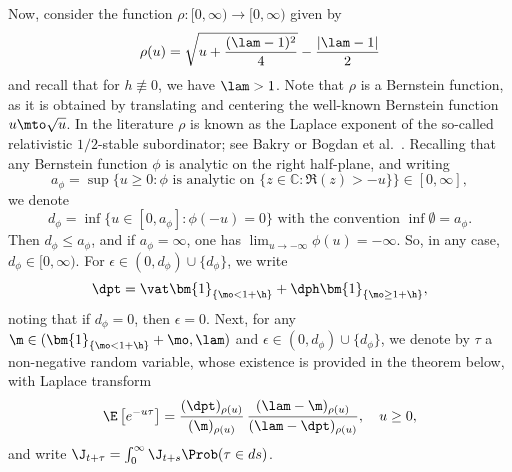 Now, consider the function $\rho:[0,\infty) \to [0,\infty)$ given by
\begin{equation*}
\rho(u) = \sqrt{u+\frac{(\lam-1)^2}{4}}-\frac{\left|\lam-1\right|}{2}
\end{equation*}
and recall that for $h \not\equiv 0$, we have $\lam > 1$. Note that $\rho$ is a Bernstein function, as it is obtained by translating and centering the well-known Bernstein function $u \mto \sqrt{u}$. In the literature $\rho$ is known as the Laplace exponent of the so-called relativistic $1/2$-stable subordinator; see Bakry \cite{Bakry-relativistic} or Bogdan et al.~\cite{Potential2009}. Recalling that any Bernstein function $\phi$ is analytic on the right half-plane, and writing
\[
a_\phi=\sup\bigl\{u \ge 0 : \phi \textrm{ is analytic on } \{z \in \mathbb C : \Re(z)>-u\}\bigr\} \in [0,\infty],
\]
we denote
\begin{equation}
\label{eq:dphi}
d_{\phi} = \inf\{u \in [0,a_\phi] : \phi(-u)=0 \} \mbox{ with the convention }\inf \emptyset = a_{\phi}.
\end{equation}
Then $d_{\phi} \le a_{\phi}$, and if $a_{\phi} = \infty$, one has $\lim_{u \to - \infty} \phi(u) = - \infty$.
So, in any case, $d_{\phi} \in [0, \infty)$. For $\epsilon \in (0,d_\phi) \cup \{d_\phi\}$, we write
\begin{equation}
\label{eq:def-dtheta}
\dpt = \vat \bm{1}_{\{ \mo < 1+\h \}}+ \dph\bm{1}_{\{ \mo \geq 1+\h \}},
\end{equation}
noting that if $d_\phi=0$, then $\epsilon = 0$. Next, for any $\m \in (\bm{1}_{\{\mo < 1+\h\}} + \mo , \lam)$ and $\epsilon \in (0,d_\phi) \cup \{d_\phi\}$, we denote by $\tau$ a non-negative random variable, whose existence is provided in the theorem below, with Laplace transform
\begin{equation}
\label{eq:def-T-Laplace}
\E\left[e^{-u \tau}\right] = \frac{(\dpt)_{\rho(u)}}{(\m)_{\rho(u)}}\, \frac{(\lam-\m)_{\rho(u)}}{(\lam-\dpt)_{\rho(u)}} , \quad u \geq 0,
\end{equation}
and write $\J_{t+\tau} = \int_0^\infty \J_{t+s} \Prob(\tau \in ds)$.


